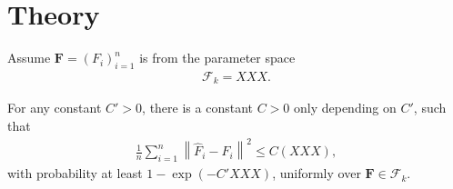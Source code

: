 

\section{Theory}

Assume $ \mathbf{F}=\left( F_i \right)_{i=1}^n$ is from the parameter space
\begin{align*}
\mathcal F_k = XXX.
\end{align*}


\begin{thm}
For any constant $C'>0$, there is a constant $C>0$ only depending on $C'$, such that
\begin{align*}
\frac{1}{n}\sum_{i=1}^n \left\| \hat F_i - F_i \right\|^2\leq C \left( XXX \right)  ,
\end{align*}
with probability at least $1-\exp \left( -C' XXX \right)  $, uniformly over $\mathbf{F}\in \mathcal F_k$.

\end{thm}

